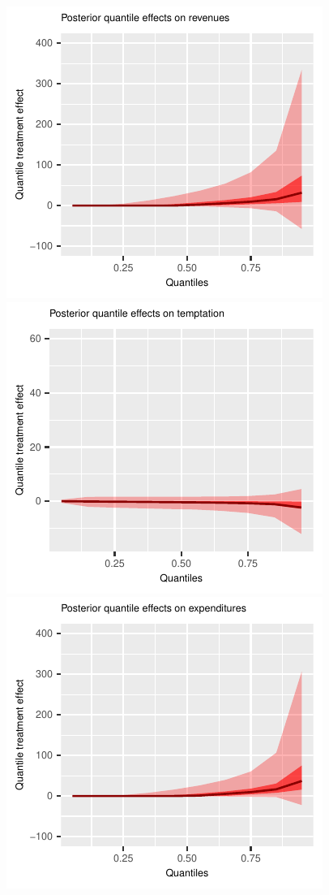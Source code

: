 \documentclass[english,12pt]{article}\usepackage{lmodern}
\numberwithin{equation}{section}
\begin{document}
\begin{figure}[h!]
        \includegraphics[scale=0.4]{posterior_parent_quantile_TEs_revenues_lognormal.pdf}\\
    \includegraphics[scale=0.4]{posterior_parent_quantile_TEs_temptation_lognormal.pdf}
        \includegraphics[scale=0.4]{posterior_parent_quantile_TEs_expenditures_lognormal.pdf}

\end{figure}
\end{document}
